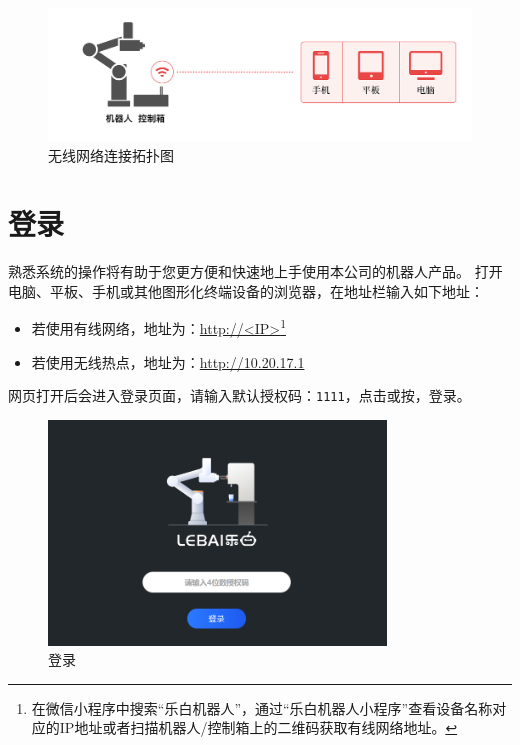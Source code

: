 \begin{figure}[ht]
    \centering
    \includegraphics[width=\textwidth]{image/network-2.pdf}
    \caption{无线网络连接拓扑图}
    \label{fig:无线网络连接拓扑图}
\end{figure}


\section{登录\LM}
熟悉\LM 系统的操作将有助于您更方便和快速地上手使用本公司的机器人产品。
打开电脑、平板、手机或其他图形化终端设备的浏览器，在地址栏输入如下地址：
\begin{itemize}
	\item 若使用有线网络，地址为：\url{http://<IP>}\footnote{在微信小程序中搜索“乐白机器人”，通过“乐白机器人小程序”查看设备名称对应的IP地址或者扫描机器人/控制箱上的二维码获取有线网络地址。}
	\item 若使用无线热点，地址为：\url{http://10.20.17.1}
\end{itemize}

网页打开后会进入登录页面，请输入默认授权码：\verb|1111|，点击或按，登录\LM。

\begin{figure}[ht]
    \centering
    \includegraphics[width=0.8\textwidth]{screen/2-4.png}
    \caption{登录\LM}
    \label{fig:登录LM}
\end{figure}

